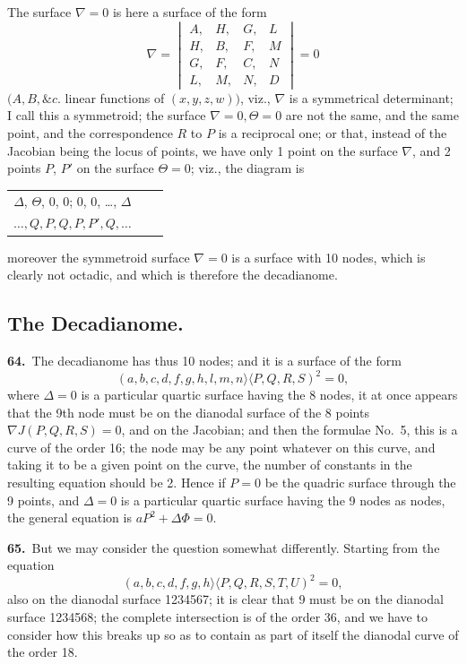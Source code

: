 \documentclass[11pt,a4paper]{article}
\newcommand{\bw}{\mathrel{\rangle\!\langle}}
\begin{document}
The surface $\nabla = 0$ is here a surface of the form
\[
\nabla = \begin{vmatrix}
A, & H, & G, & L\\
H, & B, & F, & M\\
G, & F, & C, & N\\
L, & M, & N, & D
\end{vmatrix} = 0
\]
$(A, B, \&c.$ linear functions of $(x, y, z, w))$, viz., $\nabla$ is a symmetrical determinant; I call this a symmetroid; the surface $\nabla = 0, \Theta = 0$ are not the same, and the same point, and the correspondence $R$ to $P$ is a reciprocal one; or that, instead of the Jacobian being the locus of points, we have only 1 point on the surface $\nabla$, and 2 points $P$, $P'$ on the surface $\Theta = 0$; viz., the diagram is
\begin{center}
\begin{tabular}{ccc}
$\Delta$, $\Theta$, 0, 0; 0, 0, \ldots, $\Delta$\\
$\ldots, Q, P, Q, P, P', Q, \ldots$
\end{tabular}
\end{center}
moreover the symmetroid surface $\nabla = 0$ is a surface with 10 nodes, which is clearly not octadic, and which is therefore the decadianome.

\newpage
\setcounter{page}{157}

\subsection*{The Decadianome.}

\noindent\textbf{64.}\ The decadianome has thus 10 nodes; and it is a surface of the form
\[
(a, b, c, d, f, g, h, l, m, n \bw P, Q, R, S)^2 = 0,
\]
where $\Delta = 0$ is a particular quartic surface having the 8 nodes, it at once appears that the 9th node must be on the dianodal surface of the 8 points $\nabla J(P, Q, R, S) = 0$, and on the Jacobian; and then the formulae No.\ 5, this is a curve of the order 16; the node may be any point whatever on this curve, and taking it to be a given point on the curve, the number of constants in the resulting equation should be 2. Hence if $P = 0$ be the quadric surface through the 9 points, and $\Delta = 0$ is a particular quartic surface having the 9 nodes as nodes, the general equation is $aP^2 + \Delta\Phi = 0$.

\medskip

\textbf{65.}\ But we may consider the question somewhat differently. Starting from the equation
\[
(a, b, c, d, f, g, h \bw P, Q, R, S, T, U)^2 = 0,
\]
also on the dianodal surface 1234567; it is clear that 9 must be on the dianodal surface 1234568; the complete intersection is of the order 36, and we have to consider how this breaks up so as to contain as part of itself the dianodal curve of the order 18.
\end{document}
